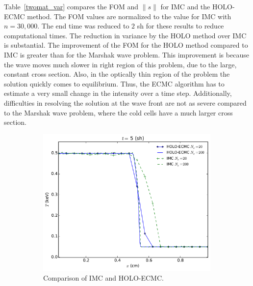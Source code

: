 \documentclass[12pt]{article}
\renewcommand{\ss}{\ensuremath{\|s\|}}
\begin{document}
\begin{center}
Table~\ref{twomat_var} compares the FOM and $\ss$ for IMC and the HOLO-ECMC method.  The FOM
values are normalized to the value for IMC with $n=30,000$.  The end time was reduced
to $2$ sh for these results to reduce computational times. The reduction in variance by
the HOLO method over IMC is substantial. The improvement of the FOM for the HOLO
method compared to IMC is greater than for the
Marshak wave problem.  This improvement is because the wave moves much slower in
right region of this problem, due to
the large, constant cross section.  Also, in the optically thin
region of the problem the solution quickly comes to equilibrium.  Thus, the ECMC
algorithm has to estimate a very small change in the intensity over a time step.  Additionally, difficulties in resolving
the solution at the wave front are not as severe compared to the Marshak wave
problem, where the cold cells have a much larger cross section.
\begin{figure}
    \centering
\begin{subfigure}{0.65\textwidth}
    \centering
    \includegraphics[width=0.99\textwidth]{two_mat_conv.pdf}
    \caption{Comparison of IMC and HOLO-ECMC.\label{twomat_full}}
\end{subfigure}    \begin{subfigure}{0.65\textwidth}
\centering

\end{subfigure}
\end{figure}
\end{center}
\end{document}
